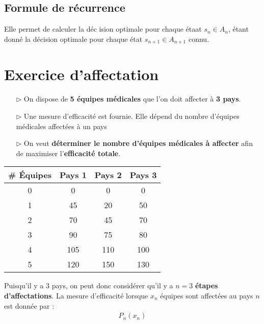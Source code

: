 \documentclass{report}
\begin{document}
\begin{multicols*}{2}
\subsection{Formule de récurrence}
Elle permet de calculer la déc ision optimale pour chaque étaat $s_n \in A_n$, 
étant donné la décision optimale pour chaque état $s_{n+1} \in A_{n+1}$ connu. 

\section{Exercice d'affectation}
\begin{itemize}
    \item [$\rhd$ ] On dispose de \textbf{5 équipes médicales} que 
        l'on doit affecter à \textbf{3 pays}. 
    \item [$\rhd$ ]  Une mesure d'efficacité est fournie. Elle dépend 
        du nombre d'équipes médicales affectées à un pays 
    \item [$\rhd$ ] On veut \textbf{déterminer le nombre d'équipes médicales à affecter} 
        afin de maximiser l'\textbf{efficacité totale}.   
\end{itemize}


\noindent
\begin{table}[H]
    \centering
\begin{tabular}{|c|c|c|c|} 
\hline
\rowcolor[gray]{0.9} %
\textbf{\# Équipes} & \textbf{Pays 1} & \textbf{Pays 2} & \textbf{Pays 3} \\ 
\hline
0 & 0 & 0 & 0 \\ \hline
1 & 45 & 20 & 50 \\ \hline
2 & 70 & 45 & 70 \\ \hline
3 & 90 & 75 & 80 \\ \hline
4 & 105 & 110 & 100 \\ \hline
5 & 120 & 150 & 130 \\ 
\hline
\end{tabular}
\end{table}

\vspace{1em}

Puisqu'il y a $3$ pays, on peut donc considérer qu'il y a
$n = 3$ \textbf{étapes d'affectations}. La mesure d'efficacité 
lorsque $x_n$ équipes sont affectées au pays $n$ 
est donnée par :
\begin{align*}
    P_n(x_n)
\end{align*}

\begin{figure}[H]
    \centering
    \begin{tikzpicture}[
    node distance=2cm and 2cm,
    every node/.style={font=\sffamily},
    box/.style={draw, minimum size=1.5cm, rectangle, align=center},
    arrow/.style={-{Stealth}, thick},
    textred/.style={text=red, font=\sffamily\small}
]


\end{tikzpicture}
\end{figure}
\end{multicols*}
\end{document}

